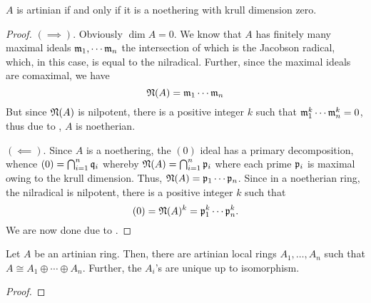 \begin{theorem}
    $A$ is artinian if and only if it is a noethering with krull dimension zero.
\end{theorem}
\begin{proof}
    $(\implies)$. Obviously $\dim A = 0$. We know that $A$ has finitely many maximal ideals $\mathfrak m_1,\cdots\mathfrak m_n$ the intersection of which is the Jacobson radical, which, in this case, is equal to the nilradical. Further, since the maximal ideals are comaximal, we have 
    \begin{equation*}
        \mathfrak N(A) = \mathfrak m_1\cdots\mathfrak m_n
    \end{equation*}
    But since $\mathfrak N(A)$ is nilpotent, there is a positive integer $k$ such that $\mathfrak m_1^k\cdots\mathfrak m_n^k = 0$, thus due to , $A$ is noetherian.

    $(\impliedby)$. Since $A$ is a noethering, the $(0)$ ideal has a primary decomposition, whence $(0) = \bigcap_{i =  1}^n\mathfrak q_i$ whereby $\mathfrak N(A) = \bigcap_{i = 1}^n\mathfrak p_i$ where each prime $\mathfrak p_i$ is maximal owing to the krull dimension. Thus, $\mathfrak N(A) = \mathfrak p_1\cdots\mathfrak p_n$. Since in a noetherian ring, the nilradical is nilpotent, there is a positive integer $k$ such that 
    \begin{equation*}
        (0) = \mathfrak N(A)^k = \mathfrak p_1^k\cdots\mathfrak p_n^k.
    \end{equation*}
    We are now done due to .
\end{proof}

\begin{theorem}
    Let $A$ be an artinian ring. Then, there are artinian local rings $A_1,\ldots,A_n$ such that $A\cong A_1\oplus\cdots\oplus A_n$. Further, the $A_i$'s are unique up to isomorphism.
\end{theorem}
\begin{proof}
    
\end{proof}